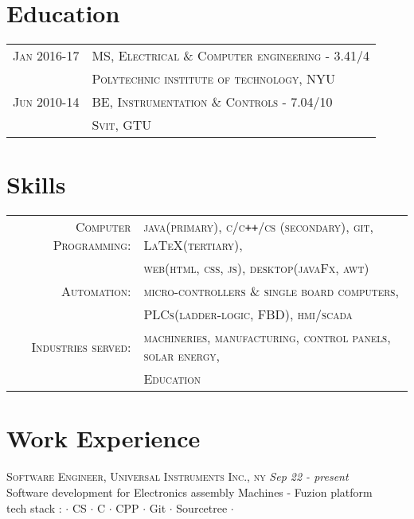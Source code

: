 \documentclass[a4paper]{article}
\begin{document}
\section	{	Education		}
	\begin{tabular}{rl}
		\small{}\textsc{		Jan 2016-17	} 		& 		\textsc{	MS, Electrical \& Computer engineering \small { - 3.41/4}			}	\\
 											& 		\textsc{	Polytechnic institute of technology, NYU							}	\\
 		\small{}\textsc{		Jun 2010-14	} 		& 		\textsc{	BE, Instrumentation \small{\&} Controls		\small { - 7.04/10}		}	\\
 											& 		\textsc{	Svit, GTU													}	\\
	\end{tabular}
	\begin{spacing}{0.5}
	\end{spacing}

\section{		Skills																													}
	\begin{tabular}{rl}	\small{}
	 	\small{}\textsc{		Computer Programming:	}	& \textsc{					java(primary), \small{c/c\texttt{++}/cs (secondary)}, git, \LaTeX (tertiary),	}	\\
  												& \textsc{					web(html, css, js), desktop(javaFx, awt)	} 	\\
 		\small{}\textsc{		Automation:			}	& \textsc{					micro-controllers \& single board computers,						}	\\
  												& \textsc{					PLCs(ladder-logic, FBD), hmi/scada								} 	\\
 		\small{}\textsc{		Industries served:		}	& \textsc{					machineries, manufacturing, control panels, solar energy,				}	\\
  												& \textsc{					Education													} 	\\
	\end{tabular}
	\begin{spacing}{0.5}
	\end{spacing}

\section	{	Work Experience																										}
%
\textsc	{		Software Engineer, Universal Instruments Inc., ny																			} \hfill \emph {Sep 22 - present	}	\\
		{	\textbullet	Software development for Electronics assembly Machines - Fuzion platform															}	\\
		{	\textbullet tech stack  : $\cdot$	CS $\cdot$ C $\cdot$ CPP $\cdot$ Git $\cdot$ Sourcetree $\cdot$												}	\\
\end{document}
